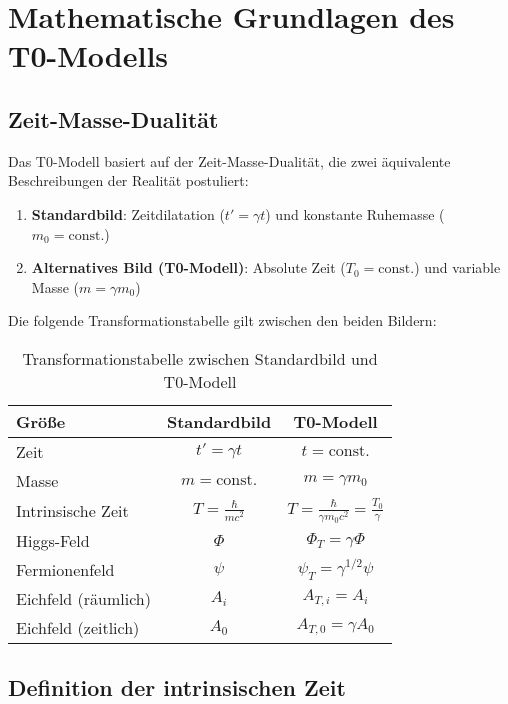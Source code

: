 \documentclass[a4paper,12pt]{article}
\theoremstyle{definition}
\theoremstyle{remark}
\begin{document}
	\section{Mathematische Grundlagen des T0-Modells}
	
	\subsection{Zeit-Masse-Dualität}
	
	Das T0-Modell basiert auf der Zeit-Masse-Dualität, die zwei äquivalente Beschreibungen der Realität postuliert:
	
	\begin{enumerate}
		\item \textbf{Standardbild}: Zeitdilatation (\(t' = \gamma t\)) und konstante Ruhemasse (\(m_0 = \text{const.}\))
		\item \textbf{Alternatives Bild (T0-Modell)}: Absolute Zeit (\(T_0 = \text{const.}\)) und variable Masse (\(m = \gamma m_0\))
	\end{enumerate}
	
	Die folgende Transformationstabelle gilt zwischen den beiden Bildern:
	
	\begin{table}[h]
		\centering
		\begin{tabular}{|l|c|c|}
			\hline
			\textbf{Größe} & \textbf{Standardbild} & \textbf{T0-Modell} \\
			\hline
			Zeit & \(t' = \gamma t\) & \(t = \text{const.}\) \\
			Masse & \(m = \text{const.}\) & \(m = \gamma m_0\) \\
			Intrinsische Zeit & \(T = \frac{\hbar}{mc^2}\) & \(T = \frac{\hbar}{\gamma m_0c^2} = \frac{T_0}{\gamma}\) \\
			Higgs-Feld & \(\Phi\) & \(\Phi_T = \gamma \Phi\) \\
			Fermionenfeld & \(\psi\) & \(\psi_T = \gamma^{1/2} \psi\) \\
			Eichfeld (räumlich) & \(A_i\) & \(A_{T,i} = A_i\) \\
			Eichfeld (zeitlich) & \(A_0\) & \(A_{T,0} = \gamma A_0\) \\
			\hline
		\end{tabular}
		\caption{Transformationstabelle zwischen Standardbild und T0-Modell}
	\end{table}
	
	\subsection{Definition der intrinsischen Zeit}
	
\end{document}
